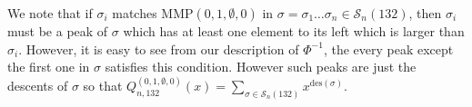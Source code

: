 \documentclass[
final,nomarks
]{dmtcs-episciences}
\newcommand{\Sn}[1]{\mathcal{S}_{#1}}
\newcommand{\Qmmn}[2]{Q_{#2,132}^{(#1)}(x)}
\newcommand{\MMP}{\mathrm{MMP}}
\begin{document}
We note that if \begin{math}\sigma_i\end{math} matches \begin{math}\MMP(0,1,\emptyset,0)\end{math} in 
\begin{math}\sigma = \sigma_1 \ldots \sigma_n \in \Sn{n}(132)\end{math}, then \begin{math}\sigma_i\end{math} must be a peak of \begin{math}\sigma\end{math} which has 
at least one element to its left which is larger than \begin{math}\sigma_i\end{math}.  However, it is easy to see 
from our description of \begin{math}\Phi^{-1}\end{math}, the every peak except the first one in \begin{math}\sigma\end{math} satisfies 
this condition. However such peaks are just the descents of \begin{math}\sigma\end{math} so that  
\begin{math}\Qmmn{0,1,\emptyset,0}{n} = \sum_{\sigma \in \Sn{n}(132)} x^{\mathrm{des}(\sigma)}\end{math}.
\end{document}
